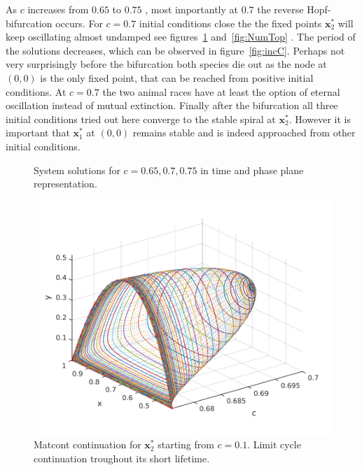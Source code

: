 As $c$ increases from $0.65$ to $0.75$ , most importantly at $0.7$ the reverse Hopf-bifurcation occurs. For $c = 0.7$ initial conditions close the the fixed points $\mathbf{x}_2^*$ will keep oscillating almost undamped see figures~\ref{[fig:incC]} and~\ref{fig:NumTop} . The period of the solutions decreases, which can be observed in figure~\ref{fig:incC}. Perhaps not very surprisingly before the bifurcation both species die out as the node at $(0,0)$ is the only fixed point, that can be reached from positive initial conditions. At $c = 0.7$ the two animal races have at least the option of eternal oscillation instead of mutual extinction. Finally after the bifurcation all three initial conditions tried out here converge to the stable spiral at $\mathbf{x}_2^*$. However it is important that $\mathbf{x}_1^*$ at $(0,0)$ remains stable and is indeed approached from other initial conditions. 


\begin{figure}
\centering






\caption{System solutions for $c = 0.65, 0.7, 0.75$ in time and phase plane representation.}
\label{[fig:incC]}
\end{figure}

\begin{figure}

\includegraphics{./plots/hcCont.pdf}
\caption{Matcont continuation for $\mathbf{x}_2^*$ starting from $c=0.1$. Limit cycle continuation troughout its short lifetime.} 
\end{figure}

